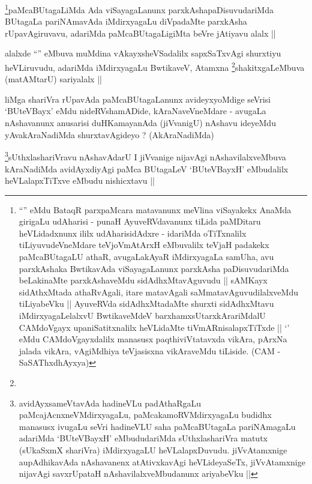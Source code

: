 \begin{artha}
\footnote[2]{``\stext'' eMdu BataqR parxpaMcara matavanunx meVlina
  viSayakekx AnaMda girigaLu udAharisi - punaH AyuveRVdavanunx tiLida
  paMDitaru heVLidadxnunx ililx udAharisidAdxre - 
\stext 
idariMda oTiTxnalilx tiLiyuvudeVneMdare teVjoVmAtArxH eMbuvalilx
teVjaH padakekx paMcaBUtagaLU athaR, avugaLakAyaR iMdirxyagaLa samUha,
avu parxkAshaka BwtikavAda viSayagaLanunx parxkAsha paDisuvudariMda
beLakinaMte parxkAshaveMdu sidAdhxMtavAguvudu || sAMKayx sidAthxMtada
athaRvAgali, itare matavAgali saMmatavAguvudilalxveMdu tiLiyabeVku ||
AyuveRVda sidAdhxMtadaMte shurxti sidAdhxMtavu iMdirxyagaLelalxvU
BwtikaveMdeV barxhamxsUtarxkArariMdalU CAMdoVgayx upaniSatitxnalilx
heVLidaMte tiVmARnisalapxTiTxde || `\stext' eMdu CAMdoVgayxdalilx
manasusx paqthiviVtatavxda vikAra, pArxNa jalada vikAra, vAgiMdhiya
teVjasisxna vikAraveMdu tiLiside. (CAM - SaSAThxdhAyxya)}paMcaBUtagaLiMda Ada viSayagaLanunx
parxkAshapaDisuvudariMda BUtagaLa pariNAmavAda iMdirxyagaLu diVpadaMte
parxkAsha rUpavAgiruvavu, adariMda paMcaBUtagaLigiMta beVre jAtiyavu
alalx ||
\end{artha}


\begin{artha}
alalxde ``\stext'' eMbuva muMdina vAkayxsheVSadalilx sapxSaTxvAgi
shurxtiyu heVLiruvudu, adariMda iMdirxyagaLu BwtikaveV,
Atamxna \footnote[1]{}shakitxgaLeMbuva (matAMtarU) sariyalalx ||
\end{artha}


\begin{artha}
liMga shariVra rUpavAda paMcaBUtagaLanunx avideyxyoMdige seVrisi
`BUteVBayx' eMdu nideRVshamADide, kAraNaveVneMdare - avugaLa
nAshavanunx anusarisi duHKamayanAda (jiVvanigU) nAshavu ideyeMdu
yAvakAraNadiMda shurxtavAgideyo ? (AkAraNadiMda)
\end{artha}


\begin{artha}
\footnote[1]{avidAyxsameVtavAda hadineVLu padAthaRgaLu
  paMcajAcnxneVMdirxyagaLu, paMcakamoRVMdirxyagaLu budidhx manasusx
  ivugaLu seVri hadineVLU saha paMcaBUtagaLa pariNAmagaLu adariMda
  `BUteVBayxH' eMbududariMda sUthxlashariVra matutx (sUkaSxmX
  shariVra) iMdirxyagaLU heVLalapxDuvudu. jiVvAtamxnige aupAdhikavAda
  nAshavanenx atAtivxkavAgi heVLideyaSeTx, jiVvAtamxnige nijavAgi
  savxrUpataH nAshavilalxveMbudanunx ariyabeVku ||}sUthxlashariVravu nAshavAdarU I jiVvanige nijavAgi
nAshavilalxveMbuva kAraNadiMda avidAyxdiyAgi paMca BUtagaLeV
`BUteVBayxH' eMbudalilx heVLalapxTiTxve eMbudu nishicxtavu ||
\end{artha}
